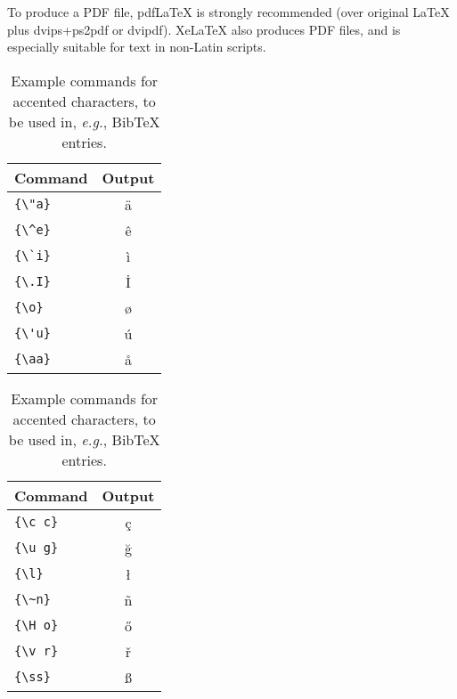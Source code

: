 \documentclass[11pt]{article}
\begin{document}
To produce a PDF file, pdf\LaTeX{} is strongly recommended (over original \LaTeX{} plus dvips+ps2pdf or dvipdf). Xe\LaTeX{} also produces PDF files, and is especially suitable for text in non-Latin scripts.
\begin{table}
\centering
\begin{tabular}{lc}
\hline
\textbf{Command} & \textbf{Output}\\
\hline
\verb|{\"a}| & {\"a} \\
\verb|{\^e}| & {\^e} \\
\verb|{\`i}| & {\`i} \\ 
\verb|{\.I}| & {\.I} \\ 
\verb|{\o}| & {\o} \\
\verb|{\'u}| & {\'u}  \\ 
\verb|{\aa}| & {\aa}  \\\hline
\end{tabular}
\begin{tabular}{lc}
\hline
\textbf{Command} & \textbf{Output}\\
\hline
\verb|{\c c}| & {\c c} \\ 
\verb|{\u g}| & {\u g} \\ 
\verb|{\l}| & {\l} \\ 
\verb|{\~n}| & {\~n} \\ 
\verb|{\H o}| & {\H o} \\ 
\verb|{\v r}| & {\v r} \\ 
\verb|{\ss}| & {\ss} \\
\hline
\end{tabular}
\caption{Example commands for accented characters, to be used in, \emph{e.g.}, Bib\TeX{} entries.}
\label{tab:accents}
\end{table}
\end{document}
